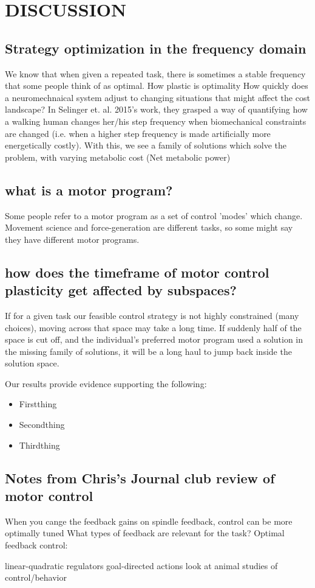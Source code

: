 \section{DISCUSSION}
\subsection{Strategy optimization in the frequency domain}
We know that when given a repeated task, there is sometimes a stable frequency that some people think of as optimal. How plastic is optimality
How quickly does a neuromechnaical system adjust to changing situations that might affect the cost landscape?
In Selinger et. al. 2015's work, they grasped a way of quantifying how a walking human changes her/his step frequency when biomechanical constraints are changed (i.e. when a higher step frequency is made artificially more energetically costly).
With this, we see a family of solutions which solve the problem, with varying metabolic cost (Net metabolic power)

\subsection{what is a motor program?}
Some people refer to a motor program as a set of control 'modes' which change.
Movement science and force-generation are different tasks, so some might say they have different motor programs.

\subsection{how does the timeframe of motor control plasticity get affected by subspaces?}
If for a given task our feasible control strategy is not highly constrained (many choices), moving across that space may take a long time.
If suddenly half of the space is cut off, and the individual's preferred motor program used a solution in the missing family of solutions, it will be a long haul to jump back inside the solution space.

Our results provide evidence supporting the following:
\begin{itemize}
	\item{Firstthing}
	\item{Secondthing}
	\item{Thirdthing}
\end{itemize}



\subsection{Notes from Chris's Journal club review of motor control}
When you cange the feedback gains on spindle feedback, control can be more optimally tuned
What types of feedback are relevant for the task?
Optimal feedback control:


linear-quadratic regulators
goal-directed actions
look at animal studies of control/behavior

